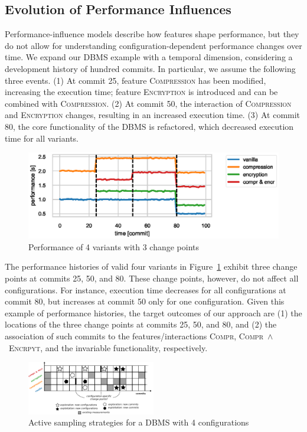 \documentclass[sigconf]{acmart}
\begin{document}
	\subsection{Evolution of Performance Influences}
	Performance-influence models describe how features shape performance, but they do not allow for understanding configuration-dependent performance changes over time.
	We expand our DBMS example with a temporal dimension, considering a development history of hundred commits.
	In particular, we assume the following three events. (1) At commit 25, feature \textsc{Compression} has been modified, increasing the execution time; feature \textsc{Encryption} is introduced and can be combined with \textsc{Compression}. (2) At commit 50, the interaction of \textsc{Compression} and \textsc{Encryption} changes, resulting in an increased execution time. (3) At commit 80, the core functionality of the DBMS is refactored, which decreased execution time for all variants.
	\begin{figure}[ht!]
		\centering
		\includegraphics[width=\linewidth]{images/dbms_performance.eps}
		\caption{Performance of 4 variants with 3 change points}
		\label{fig:dbms_performance}
	\end{figure}
	
	The performance histories of valid four variants in Figure~\ref{fig:dbms_performance} exhibit three change points at commits 25, 50, and 80. These change points, however, do not affect all configurations.
	For  instance, execution time decreases for all configurations at commit 80, but increases at commit 50 only for one configuration.
	Given this example of performance histories, the target outcomes of our approach are (1) the locations of the three change points at commits 25, 50, and 80, and (2) the association of such commits to the features/interactions \textsc{Compr}, \textsc{Compr\ $\land$\ Encrpyt}, and the invariable functionality, respectively.
	
	\begin{figure}
		\includegraphics[width=0.5\textwidth]{images/sampling_plan}
		
		\caption{Active sampling strategies for a DBMS with 4 configurations}
		\label{fig:sampling plan}
	\end{figure}
	
\end{document}
